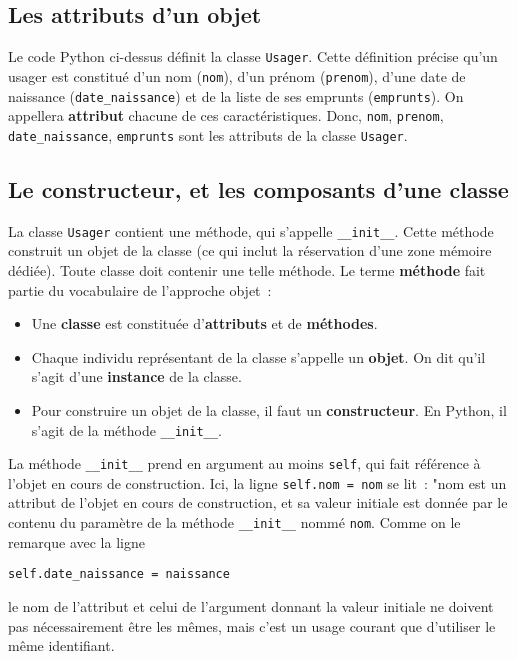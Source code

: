 \documentclass[10pt,a4paper]{sujets-exercices}
\begin{document}
\subsection*{Les attributs d'un objet}

Le code Python ci-dessus définit la classe \texttt{Usager}. Cette définition précise qu'un usager est constitué d'un nom (\texttt{nom}), d'un prénom (\texttt{prenom}), d'une date de naissance (\texttt{date\_naissance}) et de la liste de ses emprunts (\texttt{emprunts}). On appellera \textbf{attribut} chacune de ces caractéristiques. Donc, \texttt{nom}, \texttt{prenom}, \texttt{date\_naissance}, \texttt{emprunts} sont les attributs de la classe \texttt{Usager}.

\subsection*{Le constructeur, et les composants d'une classe}

La classe \texttt{Usager} contient une méthode, qui s'appelle \texttt{\_\_init\_\_}. Cette méthode construit un objet de la classe (ce qui inclut la réservation d'une zone mémoire dédiée). Toute classe doit contenir une telle méthode. Le terme \textbf{méthode} fait partie du vocabulaire de l'approche objet~:

\begin{itemize}
\item Une \textbf{classe} est constituée d'\textbf{attributs} et de \textbf{méthodes}.
\item Chaque individu représentant de la  classe s'appelle un \textbf{objet}. On dit qu'il s'agit d'une \textbf{instance} de la classe.
\item Pour construire un objet de la classe, il faut un \textbf{constructeur}. En Python, il s'agit de la méthode  \texttt{\_\_init\_\_}. 
\end{itemize}

La méthode \texttt{\_\_init\_\_} prend en argument au moins \texttt{self}, qui fait référence à l'objet en cours de construction. Ici, la ligne \texttt{self.nom = nom} se lit~: "nom est un attribut de l'objet en cours de construction, et sa valeur initiale est donnée par le contenu du paramètre de la méthode \texttt{\_\_init\_\_} nommé \texttt{nom}. Comme on le remarque avec la ligne 
\begin{center}
\texttt{self.date\_naissance = naissance}
\end{center}
le nom de l'attribut et celui de l'argument donnant la valeur initiale ne doivent pas nécessairement être les mêmes, mais c'est un usage courant que d'utiliser le même identifiant.
\end{document}
